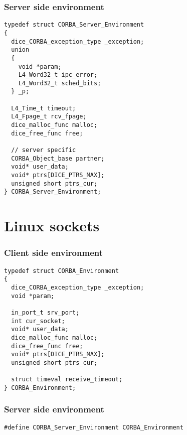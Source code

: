 \subsubsection{Server side environment}
\begin{verbatim}
typedef struct CORBA_Server_Environment
{
  dice_CORBA_exception_type _exception;
  union
  {
    void *param;
    L4_Word32_t ipc_error;
	L4_Word32_t sched_bits;
  } _p;

  L4_Time_t timeout;
  L4_Fpage_t rcv_fpage;
  dice_malloc_func malloc;
  dice_free_func free;

  // server specific
  CORBA_Object_base partner;
  void* user_data;
  void* ptrs[DICE_PTRS_MAX];
  unsigned short ptrs_cur;
} CORBA_Server_Environment;
\end{verbatim}

\section{Linux sockets}

\subsubsection{Client side environment}
\begin{verbatim}
typedef struct CORBA_Environment
{
  dice_CORBA_exception_type _exception;
  void *param;

  in_port_t srv_port;
  int cur_socket;
  void* user_data;
  dice_malloc_func malloc;
  dice_free_func free;
  void* ptrs[DICE_PTRS_MAX];
  unsigned short ptrs_cur;

  struct timeval receive_timeout;
} CORBA_Environment;
\end{verbatim}

\subsubsection{Server side environment}
\begin{verbatim}
#define CORBA_Server_Environment CORBA_Environment
\end{verbatim}

